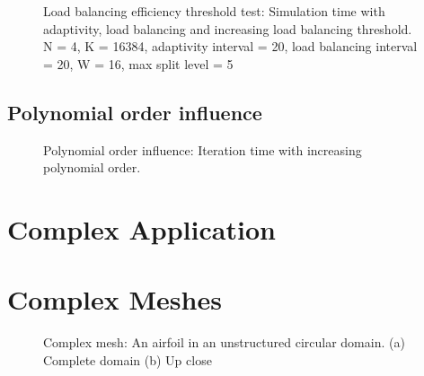 \begin{figure}[H]
	\centering
	
	\caption{Load balancing efficiency threshold test: Simulation time with adaptivity, load balancing and increasing load balancing threshold. N = 4, K = 16384, adaptivity interval = 20, load balancing interval = 20, W = 16, max split level = 5}\label{fig:load_balancing_efficiency_threshold_s5}
\end{figure}

\subsection{Polynomial order influence}\label{subsection:results:load_balancing_performance:polynomial_order}

\begin{figure}[H]
	\centering
	
	\caption{Polynomial order influence: Iteration time with increasing polynomial order.}\label{fig:N_influence}
\end{figure}

\section{Complex Application}\label{section:results:complex_application}

\section{Complex Meshes}\label{section:results:complex_meshes}

\begin{figure}[H]
	\centering
	\hfill
	\caption{Complex mesh: An airfoil in an unstructured circular domain. (a) Complete domain (b) Up close}\label{fig:complex_mesh}
\end{figure}


